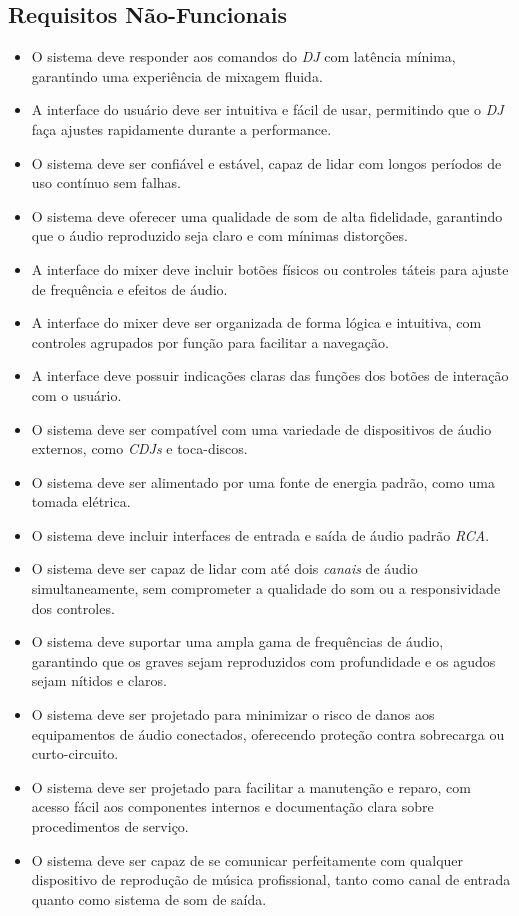 \subsection{Requisitos Não-Funcionais}
\begin{itemize}
    \item O sistema deve responder aos comandos do \textit{DJ} com latência mínima, garantindo uma experiência de mixagem fluida.
    \item A interface do usuário deve ser intuitiva e fácil de usar, permitindo que o \textit{DJ} faça ajustes rapidamente durante a performance.
    \item O sistema deve ser confiável e estável, capaz de lidar com longos períodos de uso contínuo sem falhas.
    \item O sistema deve oferecer uma qualidade de som de alta fidelidade, garantindo que o áudio reproduzido seja claro e com mínimas distorções.
    \item A interface do mixer deve incluir botões físicos ou controles táteis para ajuste de frequência e efeitos de áudio.
    \item A interface do mixer deve ser organizada de forma lógica e intuitiva, com controles agrupados por função para facilitar a navegação.
    \item A interface deve possuir indicações claras das funções dos botões de interação com o usuário.
    \item O sistema deve ser compatível com uma variedade de dispositivos de áudio externos, como \textit{CDJs} e toca-discos.
    \item O sistema deve ser alimentado por uma fonte de energia padrão, como uma tomada elétrica.
    \item O sistema deve incluir interfaces de entrada e saída de áudio padrão \textit{RCA}.
    \item O sistema deve ser capaz de lidar com até dois \textit{canais} de áudio simultaneamente, sem comprometer a qualidade do som ou a responsividade dos controles.
    \item O sistema deve suportar uma ampla gama de frequências de áudio, garantindo que os graves sejam reproduzidos com profundidade e os agudos sejam nítidos e claros.
    \item O sistema deve ser projetado para minimizar o risco de danos aos equipamentos de áudio conectados, oferecendo proteção contra sobrecarga ou curto-circuito.
    \item O sistema deve ser projetado para facilitar a manutenção e reparo, com acesso fácil aos componentes internos e documentação clara sobre procedimentos de serviço.
    \item O sistema deve ser capaz de se comunicar perfeitamente com qualquer dispositivo de reprodução de música profissional, tanto como canal de entrada quanto como sistema de som de saída.
\end{itemize}



